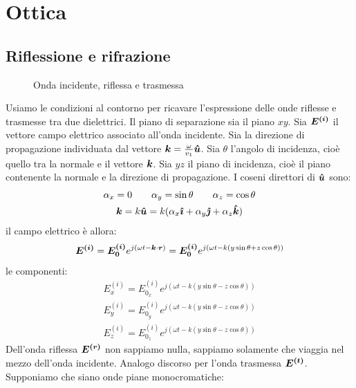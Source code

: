 \chapter{Ottica}
\minitoc
\section{Riflessione e rifrazione}
\begin{figure}[htbp]
  \centering
  
  \caption{Onda incidente, riflessa e trasmessa}
\end{figure}

Usiamo le condizioni al contorno per ricavare l'espressione delle onde riflesse e trasmesse tra due dielettrici. Il piano di separazione sia il piano $xy$. Sia $\boldsymbol{E^{(i)}}$ il vettore campo elettrico associato all'onda incidente. Sia la direzione di propagazione individuata dal vettore $\boldsymbol{k}=\frac{\omega}{v_1}\boldsymbol{\hat {u}}$. Sia $\theta$ l'angolo di incidenza, cioè quello tra la normale e il vettore $\boldsymbol{k}$. Sia $yz$ il piano di incidenza, cioè il piano contenente la normale e la direzione di propagazione. I coseni direttori di $\boldsymbol{\hat {u}}$ sono:
\begin{subequations}
  \begin{gather}
    \alpha_x = 0\qquad \alpha_y = \sin\theta\qquad \alpha_z = \cos \theta\\
    \boldsymbol{k} = k\boldsymbol{\hat {u}}=k(\alpha_x\boldsymbol{\hat {\imath}}+\alpha_y\boldsymbol{\hat {\jmath}}+\alpha_z\boldsymbol{\hat {k}})
  \end{gather}
\end{subequations}
il campo elettrico è allora:
\begin{equation}
  \boldsymbol{E^{(i)}}=\boldsymbol{E^{(i)}_0}e^{j\left(\omega t-\boldsymbol{k}\cdot\boldsymbol{r}\right)}=\boldsymbol{E^{(i)}_0}e^{j\left(\omega t-k\left(y\sin\theta+z\cos\theta\right)\right)}
\end{equation}
le componenti:
\begin{subequations}
  \begin{gather}
    E^{(i)}_x=E^{(i)}_{0_x}e^{j\left(\omega t-k\left(y\sin\theta-z\cos\theta\right)\right)}\\
    E^{(i)}_y=E^{(i)}_{0_y}e^{j\left(\omega t-k\left(y\sin\theta-z\cos\theta\right)\right)}\\
    E^{(i)}_z=E^{(i)}_{0_z}e^{j\left(\omega t-k\left(y\sin\theta-z\cos\theta\right)\right)}
  \end{gather}
\end{subequations}
Dell'onda riflessa $\boldsymbol{E^{(r)}}$ non sappiamo nulla, sappiamo solamente che viaggia nel mezzo dell'onda incidente. Analogo discorso per l'onda trasmessa $\boldsymbol{E^{(t)}}$. Supponiamo che siano onde piane monocromatiche:
